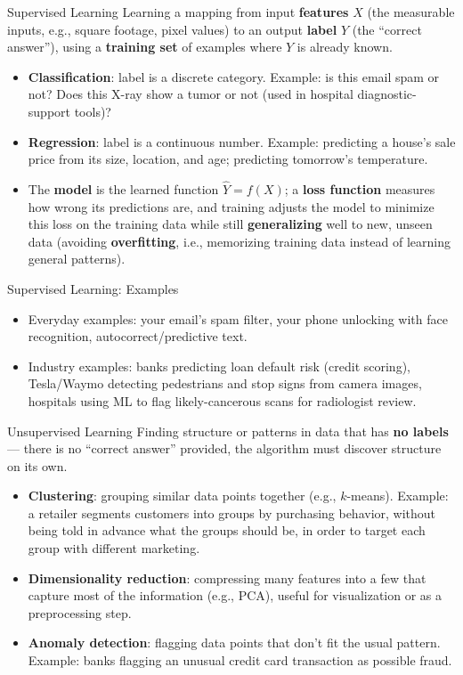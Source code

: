 \begin{frame}{Supervised Learning}
	Learning a mapping from input \textbf{features} $X$ (the measurable inputs, e.g., square footage, pixel values) to an output \textbf{label} $Y$ (the ``correct answer''), using a \textbf{training set} of examples where $Y$ is already known.

	\begin{itemize}
		\item \textbf{Classification}: label is a discrete category. Example: is this email spam or not? Does this X-ray show a tumor or not (used in hospital diagnostic-support tools)?
		\item \textbf{Regression}: label is a continuous number. Example: predicting a house's sale price from its size, location, and age; predicting tomorrow's temperature.
		\item The \textbf{model} is the learned function $\hat{Y} = f(X)$; a \textbf{loss function} measures how wrong its predictions are, and training adjusts the model to minimize this loss on the training data while still \textbf{generalizing} well to new, unseen data (avoiding \textbf{overfitting}, i.e., memorizing training data instead of learning general patterns).
	\end{itemize}
\end{frame}


\begin{frame}{Supervised Learning: Examples}
	\begin{itemize}
		\item Everyday examples: your email's spam filter, your phone unlocking with face recognition, autocorrect/predictive text.
		\item Industry examples: banks predicting loan default risk (credit scoring), Tesla/Waymo detecting pedestrians and stop signs from camera images, hospitals using ML to flag likely-cancerous scans for radiologist review.
	\end{itemize}
\end{frame}


\begin{frame}{Unsupervised Learning}
	Finding structure or patterns in data that has \textbf{no labels} --- there is no ``correct answer'' provided, the algorithm must discover structure on its own.

	\begin{itemize}
		\item \textbf{Clustering}: grouping similar data points together (e.g., $k$-means). Example: a retailer segments customers into groups by purchasing behavior, without being told in advance what the groups should be, in order to target each group with different marketing.
		\item \textbf{Dimensionality reduction}: compressing many features into a few that capture most of the information (e.g., PCA), useful for visualization or as a preprocessing step.
		\item \textbf{Anomaly detection}: flagging data points that don't fit the usual pattern. Example: banks flagging an unusual credit card transaction as possible fraud.
	\end{itemize}
\end{frame}


